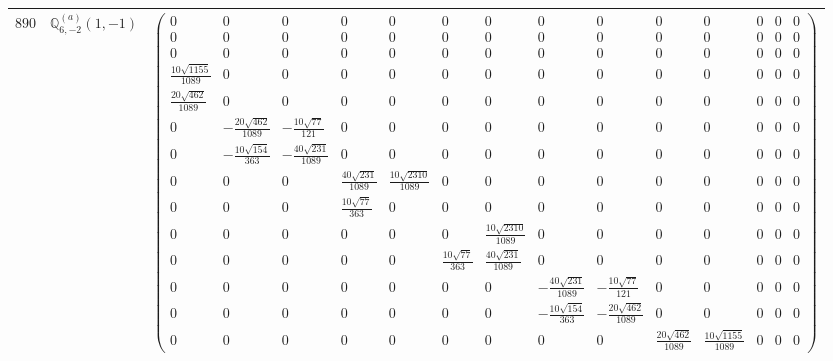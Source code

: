 \documentclass[fleqn,8pt,landscape]{jsarticle}
\begin{document}
\begin{center}
\begin{longtable}{ccc}
$ 890 $ & $ \mathbb{Q}_{6,-2}^{(a)}(1,-1) $ & $ \begin{pmatrix} 0 & 0 & 0 & 0 & 0 & 0 & 0 & 0 & 0 & 0 & 0 & 0 & 0 & 0 \\ 0 & 0 & 0 & 0 & 0 & 0 & 0 & 0 & 0 & 0 & 0 & 0 & 0 & 0 \\ 0 & 0 & 0 & 0 & 0 & 0 & 0 & 0 & 0 & 0 & 0 & 0 & 0 & 0 \\ \frac{10 \sqrt{1155}}{1089} & 0 & 0 & 0 & 0 & 0 & 0 & 0 & 0 & 0 & 0 & 0 & 0 & 0 \\ \frac{20 \sqrt{462}}{1089} & 0 & 0 & 0 & 0 & 0 & 0 & 0 & 0 & 0 & 0 & 0 & 0 & 0 \\ 0 & - \frac{20 \sqrt{462}}{1089} & - \frac{10 \sqrt{77}}{121} & 0 & 0 & 0 & 0 & 0 & 0 & 0 & 0 & 0 & 0 & 0 \\ 0 & - \frac{10 \sqrt{154}}{363} & - \frac{40 \sqrt{231}}{1089} & 0 & 0 & 0 & 0 & 0 & 0 & 0 & 0 & 0 & 0 & 0 \\ 0 & 0 & 0 & \frac{40 \sqrt{231}}{1089} & \frac{10 \sqrt{2310}}{1089} & 0 & 0 & 0 & 0 & 0 & 0 & 0 & 0 & 0 \\ 0 & 0 & 0 & \frac{10 \sqrt{77}}{363} & 0 & 0 & 0 & 0 & 0 & 0 & 0 & 0 & 0 & 0 \\ 0 & 0 & 0 & 0 & 0 & 0 & \frac{10 \sqrt{2310}}{1089} & 0 & 0 & 0 & 0 & 0 & 0 & 0 \\ 0 & 0 & 0 & 0 & 0 & \frac{10 \sqrt{77}}{363} & \frac{40 \sqrt{231}}{1089} & 0 & 0 & 0 & 0 & 0 & 0 & 0 \\ 0 & 0 & 0 & 0 & 0 & 0 & 0 & - \frac{40 \sqrt{231}}{1089} & - \frac{10 \sqrt{77}}{121} & 0 & 0 & 0 & 0 & 0 \\ 0 & 0 & 0 & 0 & 0 & 0 & 0 & - \frac{10 \sqrt{154}}{363} & - \frac{20 \sqrt{462}}{1089} & 0 & 0 & 0 & 0 & 0 \\ 0 & 0 & 0 & 0 & 0 & 0 & 0 & 0 & 0 & \frac{20 \sqrt{462}}{1089} & \frac{10 \sqrt{1155}}{1089} & 0 & 0 & 0 \end{pmatrix} $ \\ \hline

\end{longtable}
\end{center}
\end{document}
